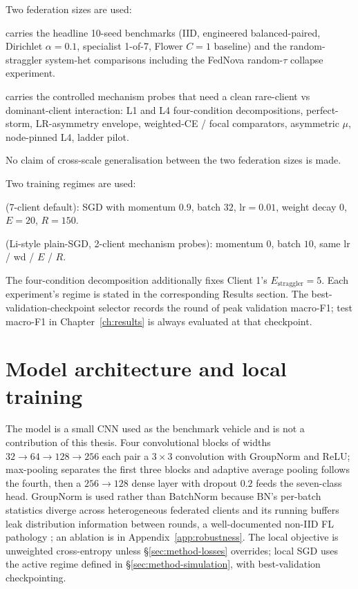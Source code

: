 \documentclass[11pt,a4paper]{report}
\begin{document}
Two federation sizes are used:
\begin{description}
  \setlength{\itemsep}{2pt}
  \item[7-client federation] carries the headline 10-seed benchmarks
    (IID, engineered balanced-paired, Dirichlet $\alpha = 0.1$,
    specialist 1-of-7, Flower $C = 1$ baseline) and the random-straggler
    system-het comparisons including the FedNova random-$\tau$ collapse
    experiment.
  \item[2-client federation] carries the controlled mechanism probes
    that need a clean rare-client vs dominant-client interaction: L1
    and L4 four-condition decompositions, perfect-storm, LR-asymmetry
    envelope, weighted-CE / focal comparators, asymmetric $\mu$,
    node-pinned L4, ladder pilot.
\end{description}
No claim of cross-scale generalisation between the two federation sizes
is made.

Two training regimes are used:
\begin{description}
  \setlength{\itemsep}{2pt}
  \item[Regime A] (7-client default): SGD with momentum $0.9$, batch
    $32$, $\textrm{lr} = 0.01$, weight decay $0$, $E = 20$, $R = 150$.
  \item[Regime B] (Li-style plain-SGD, 2-client mechanism probes):
    momentum $0$, batch $10$, same lr / wd / $E$ / $R$.
\end{description}
The four-condition decomposition additionally fixes Client 1's
$E_{\textrm{straggler}} = 5$. Each experiment's regime is stated in
the corresponding Results section. The best-validation-checkpoint
selector records the round of peak validation macro-F1; test macro-F1
in Chapter~\ref{ch:results} is always evaluated at that checkpoint.

\section{Model architecture and local training}
\label{sec:method-model}

The model is a small CNN used as the benchmark vehicle and is not a
contribution of this thesis. Four convolutional blocks of widths
$32 \to 64 \to 128 \to 256$ each pair a $3 \times 3$ convolution with
GroupNorm \citep{wu2018groupnorm} and ReLU; max-pooling separates the
first three blocks and adaptive average pooling follows the fourth, then
a $256 \to 128$ dense layer with dropout $0.2$ feeds the seven-class
head. GroupNorm is used rather than BatchNorm because BN's per-batch
statistics diverge across heterogeneous federated clients and its
running buffers leak distribution information between rounds, a
well-documented non-IID FL pathology \citep{hsieh2020quagmire}; an
ablation is in Appendix~\ref{app:robustness}. The local objective is
unweighted cross-entropy unless §\ref{sec:method-losses} overrides;
local SGD uses the active regime defined in
§\ref{sec:method-simulation}, with best-validation checkpointing.
\end{document}

